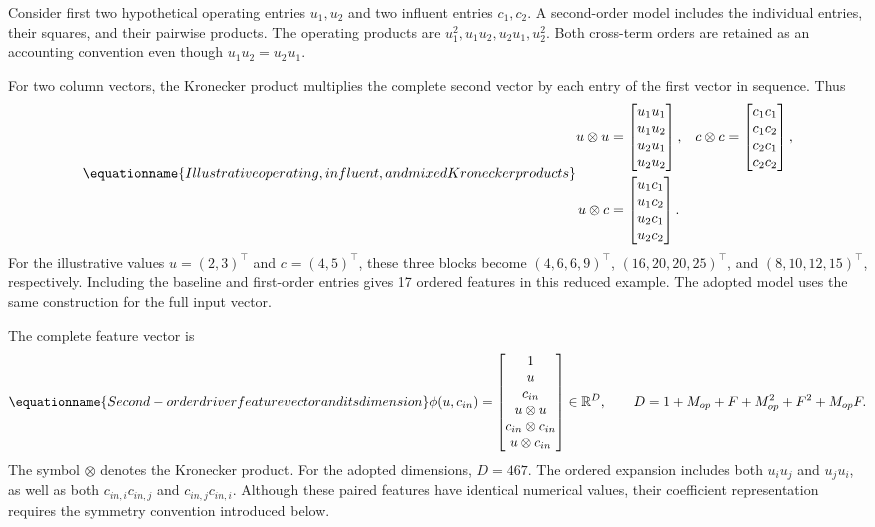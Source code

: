 Consider first two hypothetical operating entries \(u_1,u_2\) and two influent entries \(c_1,c_2\). A second-order model includes the individual entries, their squares, and their pairwise products. The operating products are \(u_1^2,u_1u_2,u_2u_1,u_2^2\). Both cross-term orders are retained as an accounting convention even though \(u_1u_2=u_2u_1\).

For two column vectors, the Kronecker product multiplies the complete second vector by each entry of the first vector in sequence. Thus
\begin{equation}
\equationname{Illustrative operating, influent, and mixed Kronecker products}
\label{eq:icsor_small_kronecker}
\begin{aligned}
u\otimes u&=\begin{bmatrix}u_1u_1\\u_1u_2\\u_2u_1\\u_2u_2\end{bmatrix},
&c\otimes c&=\begin{bmatrix}c_1c_1\\c_1c_2\\c_2c_1\\c_2c_2\end{bmatrix},\\
u\otimes c&=\begin{bmatrix}u_1c_1\\u_1c_2\\u_2c_1\\u_2c_2\end{bmatrix}.
\end{aligned}
\end{equation}
For the illustrative values \(u=(2,3)^\top\) and \(c=(4,5)^\top\), these three blocks become \((4,6,6,9)^\top\), \((16,20,20,25)^\top\), and \((8,10,12,15)^\top\), respectively. Including the baseline and first-order entries gives 17 ordered features in this reduced example. The adopted model uses the same construction for the full input vector.

The complete feature vector is
\begin{equation}
\equationname{Second-order driver feature vector and its dimension}
\label{eq:icsor_features}
\phi(u,c_{in})=
\begin{bmatrix}
1\\u\\c_{in}\\u\otimes u\\c_{in}\otimes c_{in}\\u\otimes c_{in}
\end{bmatrix}
\in\mathbb{R}^{D},
\qquad
D=1+M_{op}+F+M_{op}^{2}+F^{2}+M_{op}F.
\end{equation}
The symbol \(\otimes\) denotes the Kronecker product. For the adopted dimensions, \(D=467\). The ordered expansion includes both \(u_i u_j\) and \(u_j u_i\), as well as both \(c_{in,i}c_{in,j}\) and \(c_{in,j}c_{in,i}\). Although these paired features have identical numerical values, their coefficient representation requires the symmetry convention introduced below.

